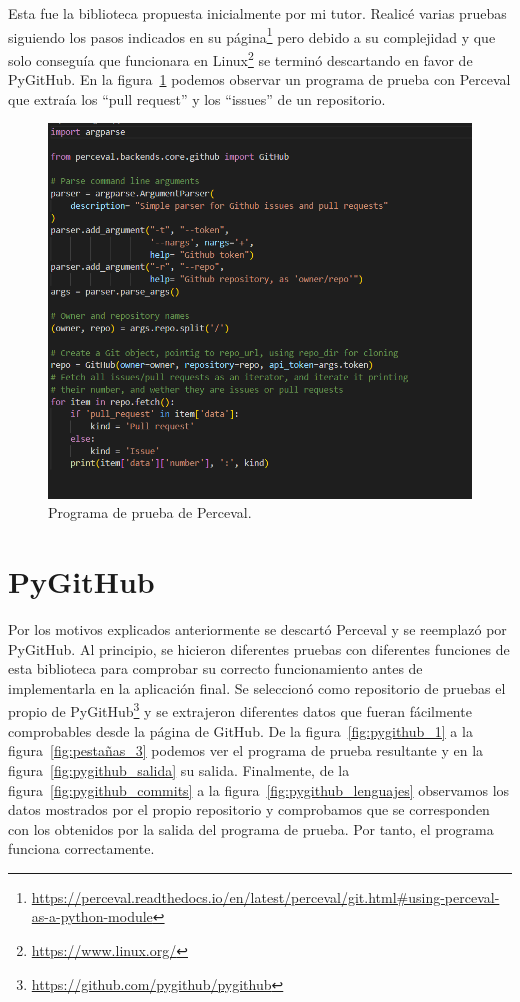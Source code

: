 \documentclass[a4paper, 12pt]{book}
\begin{document}
Esta fue la biblioteca propuesta inicialmente por mi tutor. Realicé varias pruebas siguiendo los pasos indicados en su página\footnote{\url{https://perceval.readthedocs.io/en/latest/perceval/git.html#using-perceval-as-a-python-module}} pero debido a su complejidad y que solo conseguía que funcionara en Linux\footnote{\url{https://www.linux.org/}} se terminó descartando en favor de PyGitHub. En la figura~\ref{fig:perceval} podemos observar un programa de prueba con Perceval que extraía los ``pull request'' y los ``issues'' de un repositorio.

\begin{figure}
    \centering
    \includegraphics[width=1\textwidth, keepaspectratio]{img/perceval.png}
    \caption{Programa de prueba de Perceval.}\label{fig:perceval}
\end{figure}

\section{PyGitHub}

Por los motivos explicados anteriormente se descartó Perceval y se reemplazó por PyGitHub. Al principio, se hicieron diferentes pruebas con diferentes funciones de esta biblioteca para comprobar su correcto funcionamiento antes de implementarla en la aplicación final. Se seleccionó como repositorio de pruebas el propio de PyGitHub\footnote{\url{https://github.com/pygithub/pygithub}} y se extrajeron diferentes datos que fueran fácilmente comprobables desde la página de GitHub. De la figura~\ref{fig:pygithub_1} a la figura~\ref{fig:pestañas_3} podemos ver el programa de prueba resultante y en la figura~\ref{fig:pygithub_salida} su salida. Finalmente, de la figura~\ref{fig:pygithub_commits} a la figura~\ref{fig:pygithub_lenguajes} observamos los datos mostrados por el propio repositorio y comprobamos que se corresponden con los obtenidos por la salida del programa de prueba. Por tanto, el programa funciona correctamente.
\end{document}
